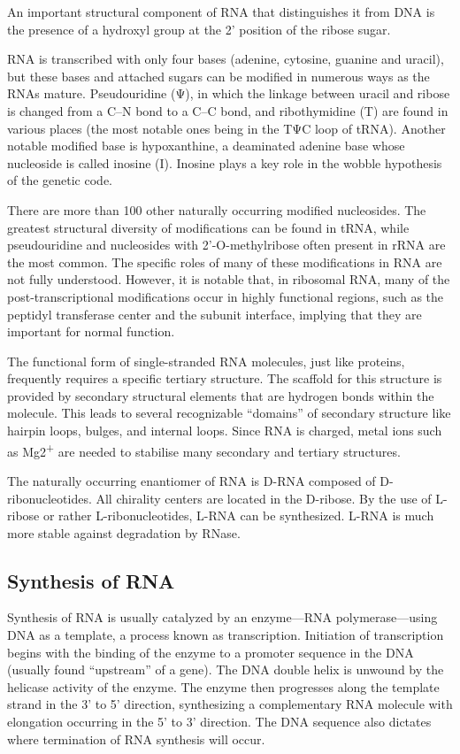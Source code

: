 An important structural component of RNA that distinguishes it from DNA is the presence of a hydroxyl group at the 2' position of the ribose sugar.

RNA is transcribed with only four bases (adenine, cytosine, guanine and uracil), but these bases and attached sugars can be modified in numerous ways as the RNAs mature. Pseudouridine (Ψ), in which the linkage between uracil and ribose is changed from a C--N bond to a C--C bond, and ribothymidine (T) are found in various places (the most notable ones being in the TΨC loop of tRNA). Another notable modified base is hypoxanthine, a deaminated adenine base whose nucleoside is called inosine (I). Inosine plays a key role in the wobble hypothesis of the genetic code.

There are more than 100 other naturally occurring modified nucleosides. The greatest structural diversity of modifications can be found in tRNA, while pseudouridine and nucleosides with 2'-O-methylribose often present in rRNA are the most common. The specific roles of many of these modifications in RNA are not fully understood. However, it is notable that, in ribosomal RNA, many of the post-transcriptional modifications occur in highly functional regions, such as the peptidyl transferase center and the subunit interface, implying that they are important for normal function.

The functional form of single-stranded RNA molecules, just like proteins, frequently requires a specific tertiary structure. The scaffold for this structure is provided by secondary structural elements that are hydrogen bonds within the molecule. This leads to several recognizable ``domains'' of secondary structure like hairpin loops, bulges, and internal loops. Since RNA is charged, metal ions such as Mg2\textsuperscript{+} are needed to stabilise many secondary and tertiary structures.

The naturally occurring enantiomer of RNA is D-RNA composed of D-ribonucleotides. All chirality centers are located in the D-ribose. By the use of L-ribose or rather L-ribonucleotides, L-RNA can be synthesized. L-RNA is much more stable against degradation by RNase.

\hypertarget{synthesis-of-rna}{%
\subsection{Synthesis of RNA}\label{synthesis-of-rna}}

Synthesis of RNA is usually catalyzed by an enzyme---RNA polymerase---using DNA as a template, a process known as transcription. Initiation of transcription begins with the binding of the enzyme to a promoter sequence in the DNA (usually found ``upstream'' of a gene). The DNA double helix is unwound by the helicase activity of the enzyme. The enzyme then progresses along the template strand in the 3' to 5' direction, synthesizing a complementary RNA molecule with elongation occurring in the 5' to 3' direction. The DNA sequence also dictates where termination of RNA synthesis will occur.

